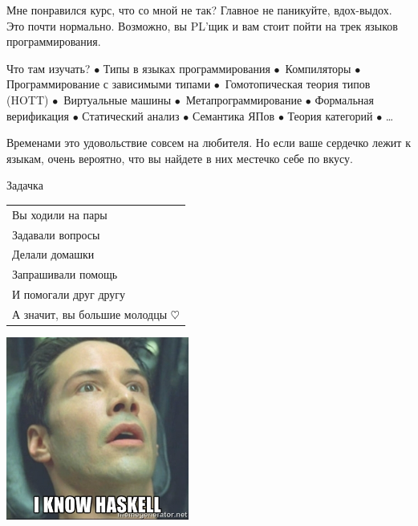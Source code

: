     \begin{frame}{Мне понравился курс, что со мной не так?}
        Главное не паникуйте, вдох-выдох. Это почти нормально. Возможно, вы PL'щик и вам стоит пойти на трек языков программирования.

        \vspace{1em}
        Что там изучать? $\bullet$ Типы в языках программирования $\bullet$~Компиляторы $\bullet$ Программирование с зависимыми типами $\bullet$~Гомотопическая теория типов (HOTT) $\bullet$~Виртуальные машины $\bullet$~Метапрограммирование $\bullet$ Формальная верификация $\bullet$ Статический анализ $\bullet$ Семантика ЯПов $\bullet$ Теория категорий $\bullet$ \ldots

        \vspace{1em}
        Временами это удовольствие совсем на любителя. Но если ваше сердечко лежит к языкам, очень вероятно, что вы найдете в них местечко себе по вкусу.
    \end{frame}

    \begin{frame}[fragile]{Задачка}
        \begin{center}
            \begin{tabular}{l}
                 Вы ходили на пары \\
                 Задавали вопросы \\
                 Делали домашки \\
                 Запрашивали помощь \\
                 И помогали друг другу \\
                \hline
                 А значит, вы большие молодцы $\heartsuit$
            \end{tabular}
        \end{center}
    \end{frame}

    \begin{frame}{}
        \vspace{2em}
        \pause
        \begin{center}
            \includegraphics[width=0.45\textwidth]{figs/iknowhaskell}
        \end{center}
    \end{frame}


